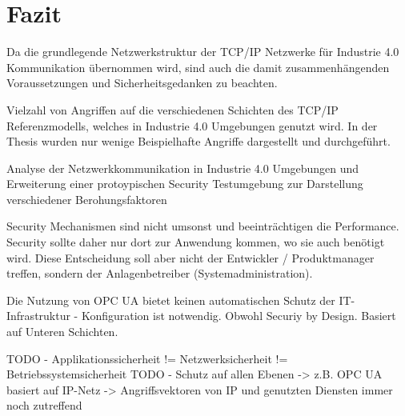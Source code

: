 \chapter{Fazit}
Da die grundlegende Netzwerkstruktur der \ac{TCP}/\ac{IP} Netzwerke für Industrie 4.0 Kommunikation übernommen wird, sind auch die damit zusammenhängenden Voraussetzungen und Sicherheitsgedanken zu beachten. \cite{sichKom2017}

Vielzahl von Angriffen auf die verschiedenen Schichten des \ac{TCP}/\ac{IP} Referenzmodells, welches in Industrie 4.0 Umgebungen genutzt wird.
In der Thesis wurden nur wenige Beispielhafte Angriffe dargestellt und durchgeführt.

Analyse der Netzwerkkommunikation in Industrie 4.0 Umgebungen und Erweiterung einer protoypischen Security Testumgebung zur Darstellung verschiedener Berohungsfaktoren

Security Mechanismen sind nicht umsonst und beeinträchtigen die Performance. Security sollte daher nur dort zur Anwendung kommen, wo sie auch benötigt wird. Diese Entscheidung soll aber nicht der Entwickler / Produktmanager treffen, sondern der Anlagenbetreiber (Systemadministration).

Die Nutzung von \ac{OPC UA} bietet keinen automatischen Schutz der IT-Infrastruktur - Konfiguration ist notwendig. Obwohl Securiy by Design. Basiert auf Unteren Schichten.

TODO - Applikationssicherheit != Netzwerksicherheit != Betriebssystemsicherheit
TODO - Schutz auf allen Ebenen -> z.B. OPC UA basiert auf IP-Netz -> Angriffsvektoren von IP und genutzten Diensten immer noch zutreffend